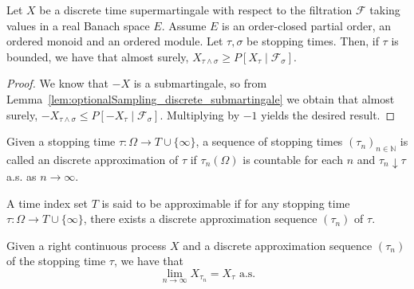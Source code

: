 \begin{lemma}\label{lem:optionalSampling_discrete_supermartingale}
  \leanok
Let $X$ be a discrete time supermartingale with respect to the filtration $\mathcal{F}$ taking values in a real Banach space $E$. Assume $E$ is an order-closed partial order, an ordered monoid and an ordered module. Let $\tau, \sigma$ be stopping times. Then, if $\tau$ is bounded, we have that almost surely, $X_{\tau \wedge \sigma} \ge P[X_{\tau} \mid \mathcal{F}_{\sigma}]$.
\end{lemma}

\begin{proof}
  \leanok
We know that $-X$ is a submartingale, so from Lemma~\ref{lem:optionalSampling_discrete_submartingale} we obtain that almost surely, $-X_{\tau \wedge \sigma} \le P[-X_{\tau} \mid \mathcal{F}_{\sigma}]$. Multiplying by $-1$ yields the desired result.
\end{proof}

\begin{definition}\label{def:approxSeq}
  \leanok
  Given a stopping time \(\tau : \Omega \to T \cup \{\infty\}\), a sequence of stopping times \((\tau_n)_{n \in \mathbb{N}}\) is called an
  discrete approximation of \(\tau\) if \(\tau_n(\Omega)\) is countable for each \(n\) and \(\tau_n \downarrow \tau\) a.s. as \(n \to \infty\).
\end{definition}

\begin{definition}\label{def:approximableTimeIndex}
  \leanok
  A time index set \(T\) is said to be approximable if for any stopping time \(\tau : \Omega \to T \cup \{\infty\}\), there exists a discrete approximation sequence \((\tau_n)\) of \(\tau\).
\end{definition}

\begin{lemma}\label{lem:tendsto_stoppedValue_discreteApproxSequence}
  \leanok
  Given a right continuous process \(X\) and a discrete approximation sequence \((\tau_n)\) of the stopping time \(\tau\), we have that
  \[\lim_{n \to \infty} X_{\tau_n} = X_\tau \text{ a.s.}\]
\end{lemma}

